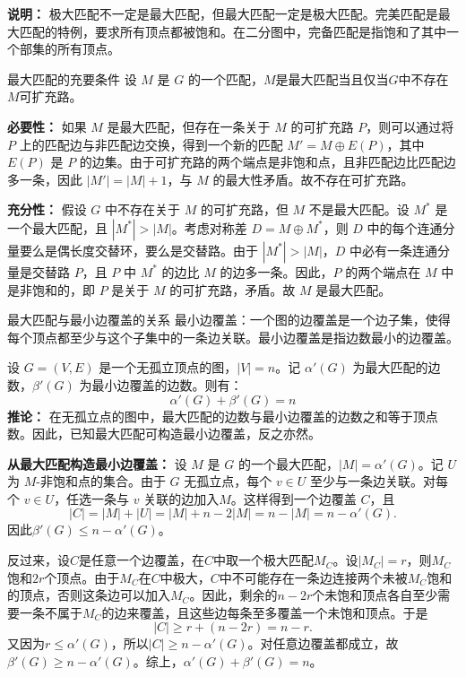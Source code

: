 \textbf{说明：}
极大匹配不一定是最大匹配，但最大匹配一定是极大匹配。完美匹配是最大匹配的特例，要求所有顶点都被饱和。在二分图中，完备匹配是指饱和了其中一个部集的所有顶点。
\begin{theorem}{最大匹配的充要条件}{}
    设 $M$ 是 $G$ 的一个匹配，$M$是最大匹配当且仅当$G$中不存在$M$可扩充路。
\end{theorem}
 \textbf{必要性：} 如果 $M$ 是最大匹配，但存在一条关于 $M$ 的可扩充路 $P$，则可以通过将 $P$ 上的匹配边与非匹配边交换，得到一个新的匹配 $M' = M \oplus E(P)$，其中 $E(P)$ 是 $P$ 的边集。由于可扩充路的两个端点是非饱和点，且非匹配边比匹配边多一条，因此 $|M'| = |M| + 1$，与 $M$ 的最大性矛盾。故不存在可扩充路。

\textbf{充分性：} 假设 $G$ 中不存在关于 $M$ 的可扩充路，但 $M$ 不是最大匹配。设 $M^*$ 是一个最大匹配，且 $|M^*| > |M|$。考虑对称差 $D = M \oplus M^*$，则 $D$ 中的每个连通分量要么是偶长度交替环，要么是交替路。由于 $|M^*| > |M|$，$D$ 中必有一条连通分量是交替路 $P$，且 $P$ 中 $M^*$ 的边比 $M$ 的边多一条。因此，$P$ 的两个端点在 $M$ 中是非饱和的，即 $P$ 是关于 $M$ 的可扩充路，矛盾。故 $M$ 是最大匹配。
\begin{theorem}{最大匹配与最小边覆盖的关系}{}
最小边覆盖：一个图的边覆盖是一个边子集，使得每个顶点都至少与这个子集中的一条边关联。最小边覆盖是指边数最小的边覆盖。

设 $G=(V,E)$ 是一个无孤立顶点的图，$|V|=n$。记 $\alpha'(G)$ 为最大匹配的边数，$\beta'(G)$ 为最小边覆盖的边数。则有：
\[
\alpha'(G) + \beta'(G) = n
\]
\textbf{推论：}
在无孤立点的图中，最大匹配的边数与最小边覆盖的边数之和等于顶点数。因此，已知最大匹配可构造最小边覆盖，反之亦然。
\end{theorem}
\textbf{从最大匹配构造最小边覆盖：}
设 $M$ 是 $G$ 的一个最大匹配，$|M| = \alpha'(G)$。记 $U$ 为 $M$-非饱和点的集合。由于 $G$ 无孤立点，每个 $v \in U$ 至少与一条边关联。对每个 $v \in U$，任选一条与 $v$ 关联的边加入$M$。这样得到一个边覆盖 $C$，且
\[
|C|=|M|+|U|=|M|+n-2|M|=n-|M|=n-\alpha'(G).
\]
因此$\beta'(G)\leqslant n-\alpha'(G)$。

反过来，设$C$是任意一个边覆盖，在$C$中取一个极大匹配$M_C$。设$|M_C|=r$，则$M_C$饱和$2r$个顶点。由于$M_C$在$C$中极大，$C$中不可能存在一条边连接两个未被$M_C$饱和的顶点，否则这条边可以加入$M_C$。因此，剩余的$n-2r$个未饱和顶点各自至少需要一条不属于$M_C$的边来覆盖，且这些边每条至多覆盖一个未饱和顶点。于是
\[
|C|\geqslant r+(n-2r)=n-r.
\]
又因为$r\leqslant \alpha'(G)$，所以$|C|\geqslant n-\alpha'(G)$。对任意边覆盖都成立，故$\beta'(G)\geqslant n-\alpha'(G)$。综上，$\alpha'(G)+\beta'(G)=n$。

